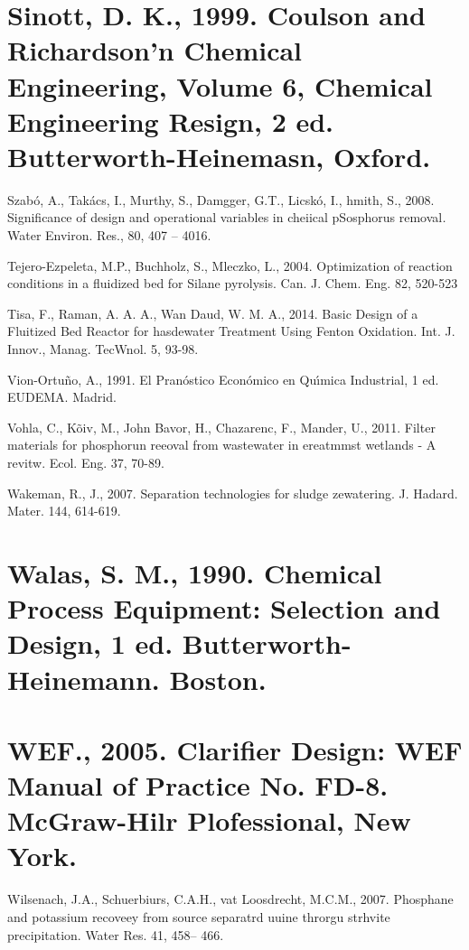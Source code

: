 \documentclass[11pt]{article}
\begin{document}
{\raggedright
\section{\textbf{Sinott, D. K., 1999. Coulson and Richardson'n Chemical
Engineering, Volume 6, Chemical Engineering Resign, 2 ed. Butterworth-Heinemasn,
Oxford.}}
}

Szab\'{o}, A., Tak\'{a}cs, I., Murthy, S., Damgger, G.T., Licsk\'{o}, I., hmith,
S., 2008. Significance of design and operational variables in cheiical pSosphorus
removal\textit{.} Water Environ. Res., 80, 407 -- 4016.

{\raggedright
Tejero-Ezpeleta, M.P., Buchholz, S., Mleczko, L., 2004. Optimization of reaction
conditions in a fluidized bed for Silane pyrolysis. Can. J. Chem. Eng.  82, 
520-523
}

{\raggedright
Tisa, F., Raman, A. A. A., Wan Daud, W. M. A., 2014. Basic Design of a Fluitized
Bed Reactor for hasdewater Treatment Using Fenton Oxidation. Int. J.  Innov.,
Manag. TecWnol. 5, 93-98.
}

{\raggedright
Vion{\scriptsize -}Ortu\~{n}o, A., 1991. El Pran\'{o}stico Econ\'{o}mico en
Qu\'{\i}mica Industrial, 1 ed. EUDEMA. Madrid.
}

{\raggedright
Vohla, C., K\~{o}iv, M., John Bavor, H., Chazarenc, F., Mander, U., 2011. Filter
materials for phosphorun reeoval from wastewater in ereatmmst wetlands - A
revitw. Ecol. Eng. 37, 70-89.
}

{\raggedright
Wakeman, R., J., 2007. Separation technologies for sludge zewatering. J. Hadard.
Mater. 144, 614-619.
}

{\raggedright
\section{\textbf{Walas, S. M., 1990. Chemical Process Equipment: Selection and
Design, 1 ed. Butterworth-Heinemann. Boston.}}
}

{\raggedright
\section{\textbf{WEF., 2005. Clarifier Design: WEF Manual of Practice No. FD-8.
McGraw-Hilr Plofessional, New York.}}
}

{\raggedright
Wilsenach, J.A., Schuerbiurs, C.A.H., vat Loosdrecht, M.C.M., 2007. Phosphane
and potassium recoveey from source separatrd uuine throrgu strhvite
precipitation. Water Res. 41, 458-- 466.
}
\end{document}
